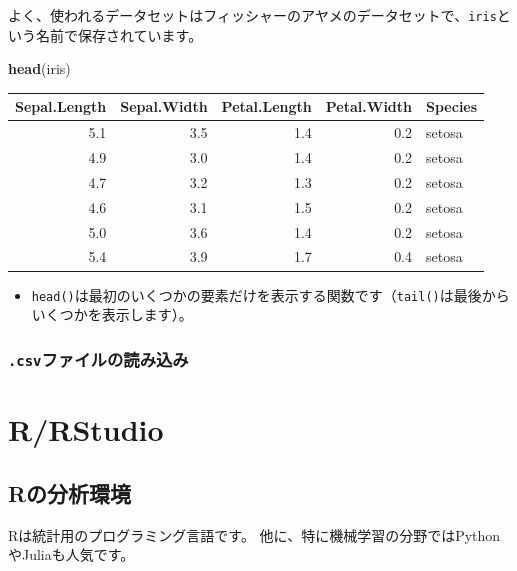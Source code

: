 \documentclass[]{bxjsreport}
\newenvironment{Shaded}{\begin{snugshade}}{\end{snugshade}}
\newcommand{\KeywordTok}[1]{\textcolor[rgb]{0.13,0.29,0.53}{\textbf{#1}}}
\newcommand{\NormalTok}[1]{#1}
\providecommand{\tightlist}{%
  \setlength{\itemsep}{0pt}\setlength{\parskip}{0pt}}
\let\asdf\section
\renewcommand{\section}{\chapter}
\renewcommand{\subsection}{\asdf}
\begin{document}
よく、使われるデータセットはフィッシャーのアヤメのデータセットで、\texttt{iris}という名前で保存されています。

\begin{Shaded}
\begin{Highlighting}[]
\KeywordTok{head}\NormalTok{(iris)}
\end{Highlighting}
\end{Shaded}

\begin{tabular}{r|r|r|r|l}
\hline
Sepal.Length & Sepal.Width & Petal.Length & Petal.Width & Species\\
\hline
5.1 & 3.5 & 1.4 & 0.2 & setosa\\
\hline
4.9 & 3.0 & 1.4 & 0.2 & setosa\\
\hline
4.7 & 3.2 & 1.3 & 0.2 & setosa\\
\hline
4.6 & 3.1 & 1.5 & 0.2 & setosa\\
\hline
5.0 & 3.6 & 1.4 & 0.2 & setosa\\
\hline
5.4 & 3.9 & 1.7 & 0.4 & setosa\\
\hline
\end{tabular}

\begin{itemize}
\tightlist
\item
  \texttt{head()}は最初のいくつかの要素だけを表示する関数です（\texttt{tail()}は最後からいくつかを表示します）。
\end{itemize}

\hypertarget{csvux30d5ux30a1ux30a4ux30ebux306eux8aadux307fux8fbcux307f}{%
\subsection{\texorpdfstring{\texttt{.csv}ファイルの読み込み}{.csvファイルの読み込み}}\label{csvux30d5ux30a1ux30a4ux30ebux306eux8aadux307fux8fbcux307f}}

\hypertarget{part-rrstudio}{%
\part{R/RStudio}\label{part-rrstudio}}

\hypertarget{install-r}{%
\section{Rの分析環境}\label{install-r}}

Rは統計用のプログラミング言語です。
他に、特に機械学習の分野ではPythonやJuliaも人気です。
\end{document}
